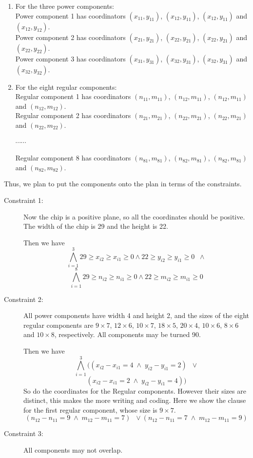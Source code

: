\documentclass[11pt]{article}
\begin{document}
{\begin{enumerate}
  \item For the three power components:\\
  Power component 1 has coordinators $(x_{11}, y_{11})$, $(x_{12}, y_{11})$, $(x_{12}, y_{11})$ and $(x_{12}, y_{12})$.\\
  Power component 2 has coordinators $(x_{21}, y_{21})$, $(x_{22}, y_{21})$, $(x_{22}, y_{21})$ and $(x_{22}, y_{22})$.\\
  Power component 3 has coordinators $(x_{31}, y_{31})$, $(x_{32}, y_{31})$, $(x_{32}, y_{31})$ and $(x_{32}, y_{32})$.
  \item For the eight regular components:\\
  Regular component 1 has coordinators $(n_{11}, m_{11})$, $(n_{12}, m_{11})$, $(n_{12}, m_{11})$ and $(n_{12}, m_{12})$.\\
  Regular component 2 has coordinators $(n_{21}, m_{21})$, $(n_{22}, m_{21})$, $(n_{22}, m_{21})$ and $(n_{22}, m_{22})$.

  $\cdots \cdots$

  Regular component 8 has coordinators $(n_{81}, m_{81})$, $(n_{82}, m_{81})$, $(n_{82}, m_{81})$ and $(n_{82}, m_{82})$.
\end{enumerate}
Thus, we plan to put the components onto the plan in terms of the constraints.

\begin{description}
  \item[Constraint 1:] Now the chip is a positive plane, so all the coordinates should be positive. The width of the chip is 29 and the height is 22.

  Then we have
  \[  \bigwedge_{i=1}^3 29 \geq x_{i2} \geq x_{i1} \geq 0 \wedge 22 \geq y_{i2} \geq y_{i1} \geq 0 \;\; \wedge \]
  \[  \bigwedge_{i=1}^8 29 \geq n_{i2} \geq n_{i1} \geq 0 \wedge 22 \geq m_{i2} \geq m_{i1} \geq 0 \]
  \item[Constraint 2:] All power components have width 4 and height 2,
  and the sizes of the eight regular components are $9 \times 7$, $12 \times 6$, $10 \times 7$, $18 \times 5$, $20 \times 4$, $10 \times 6$, $8 \times 6$ and $10 \times 8$, respectively.
  All components may be turned 90.

  Then we have
  \[  \bigwedge_{i=1}^3 ((x_{i2} - x_{i1} = 4 \; \wedge \; y_{i2} - y_{i1} = 2) \;\; \vee \]
  \[ (x_{i2} - x_{i1} = 2 \; \wedge \; y_{i2} - y_{i1} = 4)) \]
  So do the coordinates for the Regular components. However their sizes are distinct,
  this makes the more writing and coding. Here we show the clause for the first regular component,
  whose size is $9 \times 7$. \\
  \[ (n_{12} - n_{11} = 9 \; \wedge \; m_{12} - m_{11} = 7) \;\; \vee (n_{12} - n_{11} = 7 \; \wedge \; m_{12} - m_{11} = 9) \]
  \item[Constraint 3:] All components may not overlap.


\end{description}}
\end{document}
